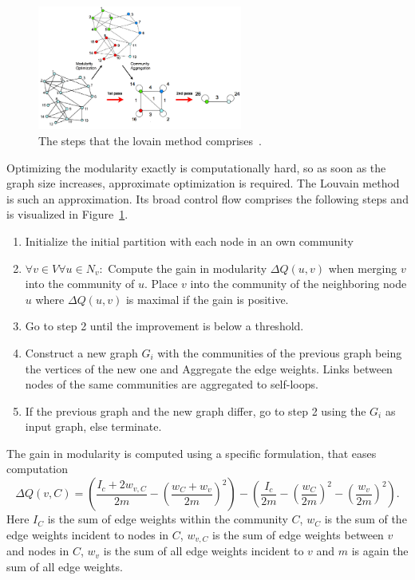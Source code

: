                 \begin{figure}[htp]
                    \begin{center}
                        \includegraphics[keepaspectratio,width=0.6\textwidth]{img/03-graphs/louvain.png}
                    \end{center}
                    \caption{The steps that the lovain method comprises~\autocite{blondel2008fast}.} 
                    \label{louvain-fig}
                \end{figure}
                
                Optimizing the modularity exactly is computationally hard, so as soon as the graph size increases, approximate optimization is required.
                The Louvain method is such an approximation.
                Its broad control flow comprises the following steps and is visualized in Figure~\ref{louvain-fig}.
                \begin{enumerate}
                \item Initialize the initial partition with each node in an own community
                \item $\forall v \in V \forall u \in N_v:$ 
                Compute the gain in modularity $\Delta Q(u,v)$ when merging $v$ into the community of $u$. 
                Place $v$ into the community of the neighboring node $u$ where $\Delta Q(u,v)$ is maximal if the gain is positive.
                \item Go to step 2 until the improvement is below a threshold.
                \item Construct a new graph $G_i$ with the communities of the previous graph being the vertices of the new one and Aggregate the edge weights. 
                Links between nodes of the same communities are aggregated to self-loops.
                \item If the previous graph and the new graph differ, go to step 2 using the $G_i$ as input graph, else terminate.
                \end{enumerate}
                The gain in modularity is computed using a specific formulation, that eases computation
                \[ 
                  \Delta Q(v, C) = \left( \frac{I_c + 2w_{v, C}}{2m} - \left( \frac{w_C + w_v}{2m} \right)^2 \right) - \left( \frac{I_c}{2m} - \left( \frac{w_C}{2m} \right)^2 - \left( \frac{w_v}{2m} \right)^2 \right).
                \]
                Here $I_C$ is the sum of edge weights within the community $C$, $w_C$ is the sum of the edge weights incident to nodes in $C$, $w_{v, C}$ is the sum of edge weights between $v$ and nodes in $C$, $w_v$ is the sum of all edge weights incident to $v$ and $m$ is again the sum of all edge weights.
                
